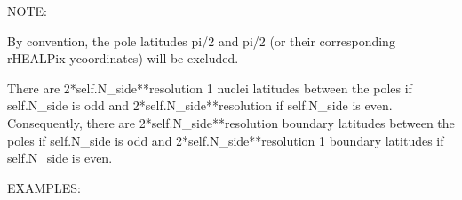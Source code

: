 \documentclass[a4paper,12ptopenany,oneside,english]{sphinxmanual}
\begin{document}
\begin{fulllineitems}
\begin{fulllineitems}
\sphinxAtStartPar
NOTE:

\sphinxAtStartPar
By convention, the pole latitudes pi/2 and \sphinxhyphen{}pi/2 (or their
corresponding rHEALPix y\sphinxhyphen{}coordinates) will be excluded.

\sphinxAtStartPar
There are 2*self.N\_side**resolution \sphinxhyphen{} 1 nuclei
latitudes between the poles if self.N\_side is odd and
2*self.N\_side**resolution if self.N\_side is even.
Consequently, there are 2*self.N\_side**resolution
boundary latitudes between the poles if self.N\_side is odd and
2*self.N\_side**resolution \sphinxhyphen{} 1 boundary latitudes if self.N\_side is
even.

\sphinxAtStartPar
EXAMPLES:

\begin{sphinxVerbatim}[commandchars=\\\{\}]
  
      
     

       
     
\end{sphinxVerbatim}

\end{fulllineitems}


\end{fulllineitems}
\end{document}

